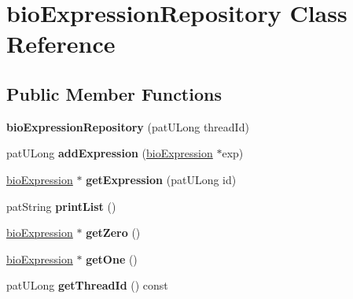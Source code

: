 \hypertarget{classbio_expression_repository}{}\section{bio\+Expression\+Repository Class Reference}
\label{classbio_expression_repository}
\subsection*{Public Member Functions}
\begin{DoxyCompactItemize}
\item 
\mbox{\label{classbio_expression_repository_a16d4ee94a69bcddc72dc4df4b53155da}} 
{\bfseries bio\+Expression\+Repository} (pat\+U\+Long thread\+Id)
\item 
\mbox{\label{classbio_expression_repository_a0642f65b7112537d8d87bdf8a9ad37cf}} 
pat\+U\+Long {\bfseries add\+Expression} (\hyperlink{classbio_expression}{bio\+Expression} $\ast$exp)
\item 
\mbox{\label{classbio_expression_repository_a72cc05d8a136a6c7e15e56a0b3740bec}} 
\hyperlink{classbio_expression}{bio\+Expression} $\ast$ {\bfseries get\+Expression} (pat\+U\+Long id)
\item 
\mbox{\label{classbio_expression_repository_aedc1a3cf2233b6a93181611375d413ab}} 
pat\+String {\bfseries print\+List} ()
\item 
\mbox{\label{classbio_expression_repository_a62ae3ba0a3d9cd9e36b1aac4ea37f152}} 
\hyperlink{classbio_expression}{bio\+Expression} $\ast$ {\bfseries get\+Zero} ()
\item 
\mbox{\label{classbio_expression_repository_a59a26329d4424ca3f96b3760ec676d1c}} 
\hyperlink{classbio_expression}{bio\+Expression} $\ast$ {\bfseries get\+One} ()
\item 
\mbox{\label{classbio_expression_repository_aaed630f83e167eb4ff591f22923d3e21}} 
pat\+U\+Long {\bfseries get\+Thread\+Id} () const
\item 

\end{DoxyCompactItemize}
